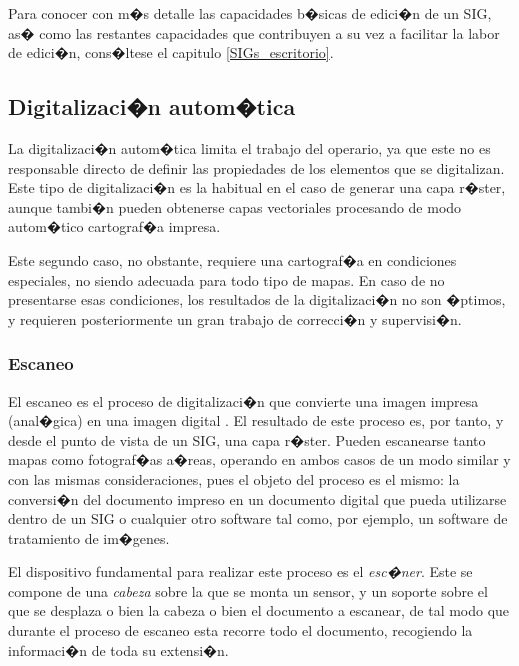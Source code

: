 Para conocer con m�s detalle las capacidades b�sicas de edici�n de un SIG, as� como las restantes capacidades que contribuyen a su vez a facilitar la labor de edici�n, cons�ltese el capitulo \ref{SIGs_escritorio}.

\subsection{Digitalizaci�n autom�tica}

La digitalizaci�n autom�tica limita el trabajo del operario, ya que este no es responsable directo de definir las propiedades de los elementos que se digitalizan. Este tipo de digitalizaci�n es la  habitual en el caso de generar una capa r�ster, aunque tambi�n pueden obtenerse capas vectoriales procesando de modo autom�tico cartograf�a impresa. 

Este segundo caso, no obstante, requiere una cartograf�a en condiciones especiales, no siendo adecuada para todo tipo de mapas. En caso de no presentarse esas condiciones, los resultados de la digitalizaci�n no son �ptimos, y requieren posteriormente un gran trabajo de correcci�n y supervisi�n.

\subsubsection{Escaneo}
\label{Escaneo}


El escaneo es el proceso de digitalizaci�n que convierte una imagen impresa (anal�gica) en una imagen digital \cite{Jackson1991Longman}. El resultado de este proceso es, por tanto, y desde el punto de vista de un SIG, una capa r�ster. Pueden escanearse tanto mapas como fotograf�as a�reas, operando en ambos casos de un modo similar y con las mismas consideraciones, pues el objeto del proceso es el mismo: la conversi�n del documento impreso en un documento digital que pueda utilizarse dentro de un SIG o cualquier otro software tal como, por ejemplo, un software de tratamiento de im�genes.

El dispositivo fundamental para realizar este proceso es el \emph{esc�ner}. Este se compone de una \emph{cabeza} sobre la que se monta un sensor, y un soporte sobre el que se desplaza o bien la cabeza o bien el documento a escanear, de tal modo que durante el proceso de escaneo esta recorre todo el documento, recogiendo la informaci�n de toda su extensi�n.

